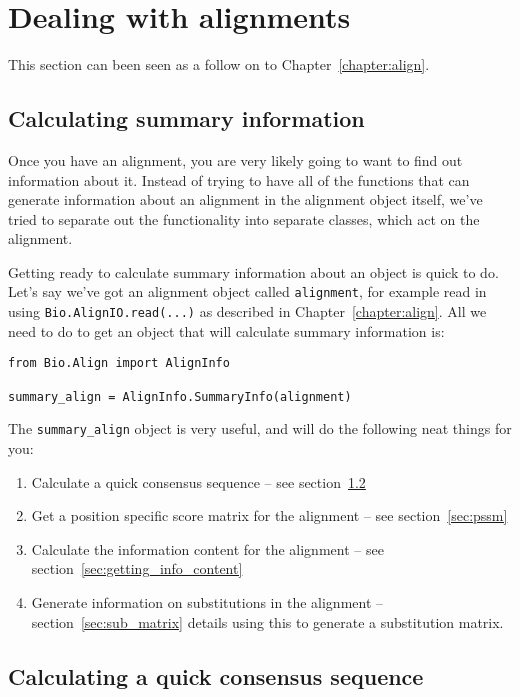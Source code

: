 \section{Dealing with alignments}

This section can been seen as a follow on to Chapter~\ref{chapter:align}.

\subsection{Calculating summary information}
\label{sec:summary_info}

Once you have an alignment, you are very likely going to want to find out information about it. Instead of trying to have all of the functions that can generate information about an alignment in the alignment object itself, we've tried to separate out the functionality into separate classes, which act on the alignment.

Getting ready to calculate summary information about an object is quick to do. Let's say we've got an alignment object called \verb|alignment|, for example read in using \verb|Bio.AlignIO.read(...)| as described in Chapter~\ref{chapter:align}. All we need to do to get an object that will calculate summary information is:

\begin{verbatim}
from Bio.Align import AlignInfo

summary_align = AlignInfo.SummaryInfo(alignment)
\end{verbatim}

The \verb|summary_align| object is very useful, and will do the following neat things for you:

\begin{enumerate}
  \item Calculate a quick consensus sequence -- see section~\ref{sec:consensus}
  \item Get a position specific score matrix for the alignment -- see section~\ref{sec:pssm}
  \item Calculate the information content for the alignment -- see section~\ref{sec:getting_info_content}
  \item Generate information on substitutions in the alignment -- section~\ref{sec:sub_matrix} details using this to generate a substitution matrix.
\end{enumerate}

\subsection{Calculating a quick consensus sequence}
\label{sec:consensus}

